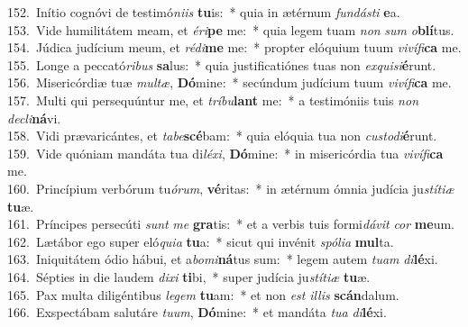 {152.~}Inítio cognóvi de testimó\textit{ni}\textit{is} \textbf{tu}is:~* quia in ætérnum \textit{fun}\textit{dá}\textit{sti} \textbf{e}a.\\
{153.~}Vide humilitátem meam, et \textit{é}\textit{ri}\textbf{pe} me:~* quia legem tuam \textit{non} \textit{sum} \textit{o}\textbf{blí}tus.\\
{154.~}Júdica judícium meum, et \textit{ré}\textit{di}\textbf{me} me:~* propter elóquium tuum \textit{vi}\textit{ví}\textit{fi}\textbf{ca} me.\\
{155.~}Longe a peccató\textit{ri}\textit{bus} \textbf{sa}lus:~* quia justificatiónes tuas non \textit{ex}\textit{qui}\textit{si}\textbf{é}runt.\\
{156.~}Misericórdiæ tuæ \textit{mul}\textit{tæ}, \textbf{Dó}mine:~* secúndum judícium tuum \textit{vi}\textit{ví}\textit{fi}\textbf{ca} me.\\
{157.~}Multi qui persequúntur me, et \textit{trí}\textit{bu}\textbf{lant} me:~* a testimóniis tuis \textit{non} \textit{de}\textit{cli}\textbf{ná}vi.\\
{158.~}Vidi prævaricántes, et \textit{ta}\textit{be}\textbf{scé}bam:~* quia elóquia tua non \textit{cu}\textit{sto}\textit{di}\textbf{é}runt.\\
{159.~}Vide quóniam mandáta tua di\textit{lé}\textit{xi}, \textbf{Dó}mine:~* in misericórdia tua \textit{vi}\textit{ví}\textit{fi}\textbf{ca} me.\\
{160.~}Princípium verbórum tu\textit{ó}\textit{rum}, \textbf{vé}ritas:~* in ætérnum ómnia judícia ju\textit{stí}\textit{ti}\textit{æ} \textbf{tu}æ.\\
{161.~}Príncipes persecúti \textit{sunt} \textit{me} \textbf{gra}tis:~* et a verbis tuis formi\textit{dá}\textit{vit} \textit{cor} \textbf{me}um.\\
{162.~}Lætábor ego super eló\textit{qui}\textit{a} \textbf{tu}a:~* sicut qui invénit \textit{spó}\textit{li}\textit{a} \textbf{mul}ta.\\
{163.~}Iniquitátem ódio hábui, et a\textit{bo}\textit{mi}\textbf{ná}tus sum:~* legem autem \textit{tu}\textit{am} \textit{di}\textbf{lé}xi.\\
{164.~}Sépties in die laudem \textit{di}\textit{xi} \textbf{ti}bi,~* super judícia ju\textit{stí}\textit{ti}\textit{æ} \textbf{tu}æ.\\
{165.~}Pax multa diligéntibus \textit{le}\textit{gem} \textbf{tu}am:~* et non \textit{est} \textit{il}\textit{lis} \textbf{scán}dalum.\\
{166.~}Exspectábam salutáre \textit{tu}\textit{um}, \textbf{Dó}mine:~* et mandáta \textit{tu}\textit{a} \textit{di}\textbf{lé}xi.\\
